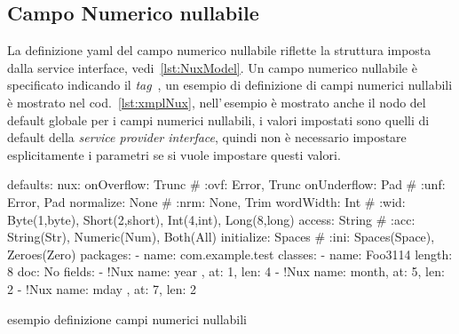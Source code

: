 \documentclass[a4paper,10pt]{report}
\newif\ifesource
\newenvironment{elisting}[1][H]
  {\captionsetup{aboveskip=0pt}\begin{listing}[#1]}
  {\end{listing}%
}
\begin{document}
\subsection{Campo Numerico nullabile} \label{sub:yaml.nux}
La definizione yaml del campo numerico nullabile riflette la struttura imposta 
dalla service interface, vedi~\ref{lst:NuxModel}.
Un campo numerico nullabile è specificato indicando il \textsl{tag} 
\,, 
un esempio di definizione di campi numerici nullabili è mostrato nel 
cod.~\ref{lst:xmplNux}, nell'\,esempio è mostrato anche il nodo del default
globale per i campi numerici nullabili, i valori impostati sono quelli di 
default della \textsl{service provider interface}, quindi non è necessario 
impostare esplicitamente i parametri se si vuole impostare questi valori.


\ifesource
\begin{figure*}[!htb]
\begin{lstlisting}[language=yaml, 
caption={esempio definizione campi numerici nullabili}, 
label=lst:xmplNux]
defaults:
  nux:
    onOverflow: Trunc   # :ovf: Error, Trunc
    onUnderflow: Pad    # :unf: Error, Pad
    normalize: None     # :nrm: None, Trim
    wordWidth: Int      # :wid: Byte(1,byte), Short(2,short), Int(4,int), Long(8,long)
    access: String      # :acc: String(Str), Numeric(Num), Both(All)
    initialize: Spaces  # :ini: Spaces(Space), Zeroes(Zero)
packages:
  - name: com.example.test
    classes:
      - name: Foo3114
        length: 8
        doc: No
        fields:
          - !Nux { name: year , at: 1, len: 4 }
          - !Nux { name: month, at: 5, len: 2 }
          - !Nux { name: mday , at: 7, len: 2 }
\end{lstlisting}
\end{figure*}
\else
\begin{elisting}[!htb]
\begin{yamlcode}
defaults:
  nux:
    onOverflow: Trunc   # :ovf: Error, Trunc
    onUnderflow: Pad    # :unf: Error, Pad
    normalize: None     # :nrm: None, Trim
    wordWidth: Int      # :wid: Byte(1,byte), Short(2,short), Int(4,int), Long(8,long)
    access: String      # :acc: String(Str), Numeric(Num), Both(All)
    initialize: Spaces  # :ini: Spaces(Space), Zeroes(Zero)
packages:
  - name: com.example.test
    classes:
      - name: Foo3114
        length: 8
        doc: No
        fields:
          - !Nux { name: year , at: 1, len: 4 }
          - !Nux { name: month, at: 5, len: 2 }
          - !Nux { name: mday , at: 7, len: 2 }
\end{yamlcode}
\caption{esempio definizione campi numerici nullabili}
\label{lst:xmplNux}
\end{elisting}
\fi
\end{document}
